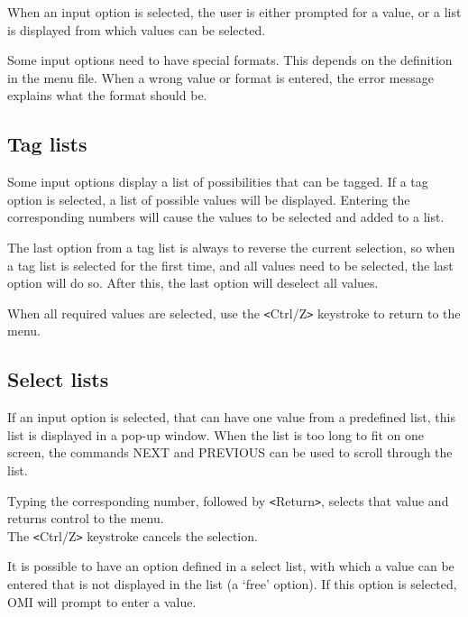 \documentclass[a4paper]{book}
\newcommand{\vs}{\vspace{3mm}}
\newcommand{\lt}{\texttt{<}}
\newcommand{\gt}{\texttt{>}}
\begin{document}
When an input option is selected, the user is either prompted for a value, 
or a list is displayed from which values can be selected.

Some input options need to have special formats. This depends on the 
definition in the menu file. When a wrong value or format is entered, the 
error message explains what the format should be.

\subsection{Tag lists}
\label{subsubsec:mylabel11}

Some input options display a list of possibilities that can be tagged. If a 
tag option is selected, a list of possible values will be displayed. 
Entering the corresponding numbers will cause the values to be selected and 
added to a list.

\vs

The last option from a tag list is always to reverse the current selection, 
so when a tag list is selected for the first time, and all values need to be 
selected, the last option will do so. After this, the last option will 
deselect all values.

When all required values are selected, use the \lt Ctrl/Z\gt{} keystroke to return 
to the menu.

\subsection{Select lists}
\label{subsubsec:select}

If an input option is selected, that can have one value from a predefined 
list, this list is displayed in a pop-up window. When the list is too long 
to fit on one screen, the commands \textsf{NEXT} and \textsf{PREVIOUS} can be used to scroll 
through the list.

Typing the corresponding number, followed by \lt Return\gt , selects that value 
and returns control to the menu. \\
The \lt Ctrl/Z\gt{} keystroke cancels the selection.

\vs

It is possible to have an option defined in a select list, with which a 
value can be entered that is not displayed in the list (a `free' option). If 
this option is selected, OMI will prompt to enter a value.
\end{document}
